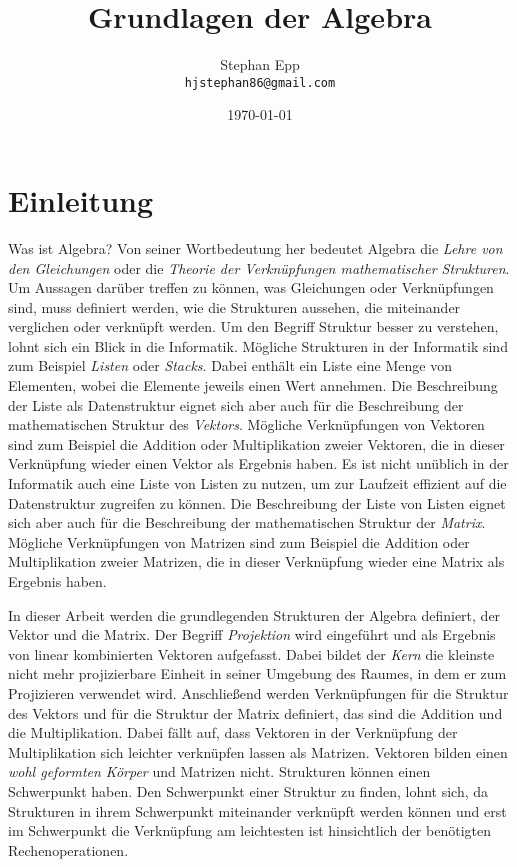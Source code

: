 \documentclass{report}
\title{Grundlagen der Algebra}
\author{Stephan Epp\\\texttt{hjstephan86@gmail.com}}
\date{\today}
\numberwithin{equation}{section}
\begin{document}
	\maketitle
	\vspace{5em}
	\tableofcontents
\chapter{Einleitung}
Was ist Algebra? Von seiner Wortbedeutung her bedeutet Algebra die \textit{Lehre von den Gleichungen} oder die \textit{Theorie der Verknüpfungen mathematischer Strukturen}. Um Aussagen darüber treffen zu können, was Gleichungen oder Verknüpfungen sind, muss definiert werden, wie die Strukturen aussehen, die miteinander verglichen oder verknüpft werden. Um den Begriff Struktur besser zu verstehen, lohnt sich ein Blick in die Informatik. Mögliche Strukturen in der Informatik sind zum Beispiel \textit{Listen} oder \textit{Stacks}. Dabei enthält ein Liste eine Menge von Elementen, wobei die Elemente jeweils einen Wert annehmen. Die Beschreibung der Liste als Datenstruktur eignet sich aber auch für die Beschreibung der mathematischen Struktur des \textit{Vektors}. Mögliche Verknüpfungen von Vektoren sind zum Beispiel die Addition oder Multiplikation zweier Vektoren, die in dieser Verknüpfung wieder einen Vektor als Ergebnis haben. Es ist nicht unüblich in der Informatik auch eine Liste von Listen zu nutzen, um zur Laufzeit effizient auf die Datenstruktur zugreifen zu können. Die Beschreibung der Liste von Listen eignet sich aber auch für die Beschreibung der mathematischen Struktur der \textit{Matrix}. Mögliche Verknüpfungen von Matrizen sind zum Beispiel die Addition oder Multiplikation zweier Matrizen, die in dieser Verknüpfung wieder eine Matrix als Ergebnis haben.

In dieser Arbeit werden die grundlegenden Strukturen der Algebra definiert, der Vektor und die Matrix. Der Begriff \textit{Projektion} wird eingeführt und als Ergebnis von linear kombinierten Vektoren aufgefasst. Dabei bildet der \textit{Kern} die kleinste nicht mehr projizierbare Einheit in seiner Umgebung des Raumes, in dem er zum Projizieren verwendet wird. Anschließend werden Verknüpfungen für die Struktur des Vektors und für die Struktur der Matrix definiert, das sind die Addition und die Multiplikation. Dabei fällt auf, dass Vektoren in der Verknüpfung der Multiplikation sich leichter verknüpfen lassen als Matrizen. Vektoren bilden einen \textit{wohl geformten Körper} und Matrizen nicht. Strukturen können einen Schwerpunkt haben. Den Schwerpunkt einer Struktur zu finden, lohnt sich, da Strukturen in ihrem Schwerpunkt miteinander verknüpft werden können und erst im Schwerpunkt die Verknüpfung am leichtesten ist hinsichtlich der benötigten Rechenoperationen.
\end{document}
